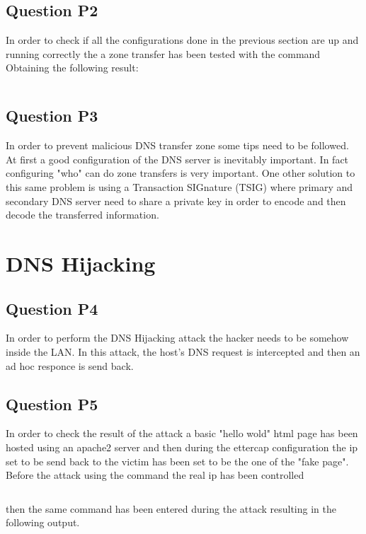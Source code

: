 \inputminted{text}{rndc_status.txt}
\label{conf:rndc_status}

\subsection{Question P2}
In order to check if all the configurations done in the previous section are up and running correctly the a zone transfer has been tested with the command  Obtaining the following result:

\inputminted{text}{zone_transfer.txt}
\label{conf:zone_transfer}

\subsection{Question P3}
In order to prevent malicious DNS transfer zone some tips need to be followed. At first a good configuration of the DNS server is inevitably important. In fact configuring "who" can do zone transfers is very important. One other solution to this same problem is using a Transaction SIGnature (TSIG) where primary and secondary DNS server need to share a private key in order to encode and then decode the transferred information.

\section{DNS Hijacking}

\subsection{Question P4}
In order to perform the DNS Hijacking attack the hacker needs to be somehow inside the LAN. In this attack, the host's DNS request is intercepted and then an ad hoc responce is send back.

\subsection{Question P5}
In order to check the result of the attack a basic "hello wold" html page has been hosted using an apache2 server and then during the ettercap configuration the ip set to be send back to the victim has been set to be the one of the "fake page".
Before the attack using the command  the real ip has been controlled

\inputminted{text}{pre_hijacking.txt}
\label{conf:pre_hijacking}
then the same command has been entered during the attack resulting in the following output.


